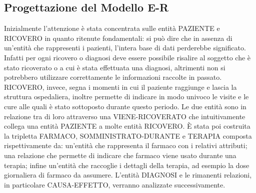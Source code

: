 \documentclass{article}
\begin{document}
\clearpage
\subsection{Progettazione del Modello E-R}
Inizialmente l'attenzione è stata concentrata sulle entità PAZIENTE e RICOVERO
in quanto ritenute fondamentali: si può dire che in assenza di un'entità che
rappresenti i pazienti, l'intera base di dati perderebbe significato.  Infatti
per ogni ricovero o diagnosi deve essere possibile risalire al soggetto che è
stato ricoverato o a cui è stata effettuata una diagnosi, altrimenti non si
potrebbero utilizzare correttamente le informazioni raccolte in passato.
RICOVERO, invece, segna i momenti in cui il paziente raggiunge e lascia la
struttura ospedaliera, inoltre permette di indicare in modo univoco le visite e
le cure alle quali è stato sottoposto durante questo periodo.  Le due entità
sono in relazione tra di loro attraverso una VIENE-RICOVERATO che intuitivamente
collega una entità PAZIENTE a molte entità RICOVERO.  È stata poi costruita la
tripletta FARMACO, SOMMINISTRATO-DURANTE e TERAPIA composta rispettivamente da:
un'entità che rappresenta il farmaco con i relativi attributi; una relazione che
permette di indicare che farmaco viene usato durante una terapia; infine
un'entità che raccoglie i dettagli della terapia, ad esempio la dose giornaliera
di farmaco da assumere.  L'entità DIAGNOSI e le rimanenti relazioni, in
particolare CAUSA-EFFETTO, verranno analizzate successivamente.
\end{document}
